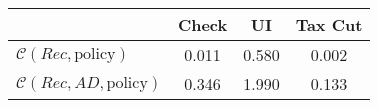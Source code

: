 \begin{tabular}{@{}lccc@{}}
\toprule
                          & Check      & UI    & Tax Cut    \\  \midrule
$\mathcal{C}(Rec,\text{policy})$ & 0.011  & 0.580  & 0.002     \\
$\mathcal{C}(Rec, AD,\text{policy})$ & 0.346  & 1.990  & 0.133     \\
\end{tabular}
